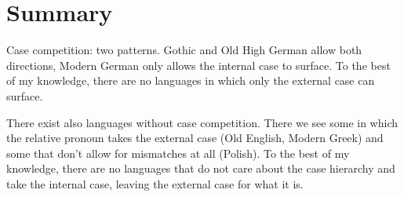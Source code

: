 \section{Summary}

Case competition: two patterns. Gothic and Old High German allow both directions, Modern German only allows the internal case to surface. To the best of my knowledge, there are no languages in which only the external case can surface.

There exist also languages without case competition. There we see some in which the relative pronoun takes the external case (Old English, Modern Greek) and some that don't allow for mismatches at all (Polish). To the best of my knowledge, there are no languages that do not care about the case hierarchy and take the internal case, leaving the external case for what it is.
